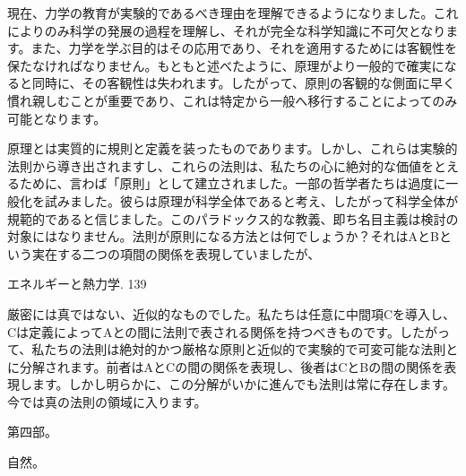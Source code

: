 \documentclass[a4paper,11pt,openany]{ltjsbook}
\begin{document}
現在、力学の教育が実験的であるべき理由を理解できるようになりました。これによりのみ科学の発展の過程を理解し、それが完全な科学知識に不可欠となります。また、力学を学ぶ目的はその応用であり、それを適用するためには客観性を保たなければなりません。もともと述べたように、原理がより一般的で確実になると同時に、その客観性は失われます。したがって、原則の客観的な側面に早く慣れ親しむことが重要であり、これは特定から一般へ移行することによってのみ可能となります。

原理とは実質的に規則と定義を装ったものであります。しかし、これらは実験的法則から導き出されますし、これらの法則は、私たちの心に絶対的な価値をとえるために、言わば「原則」として建立されました。一部の哲学者たちは過度に一般化を試みました。彼らは原理が科学全体であると考え、したがって科学全体が規範的であると信じました。このパラドックス的な教義、即ち名目主義は検討の対象にはなりません。法則が原則になる方法とは何でしょうか？それはAとBという実在する二つの項間の関係を表現していましたが、

エネルギーと熱力学. 139

厳密には真ではない、近似的なものでした。私たちは任意に中間項Cを導入し、Cは定義によってAとの間に法則で表される関係を持つべきものです。したがって、私たちの法則は絶対的かつ厳格な原則と近似的で実験的で可変可能な法則とに分解されます。前者はAとCの間の関係を表現し、後者はCとBの間の関係を表現します。しかし明らかに、この分解がいかに進んでも法則は常に存在します。今では真の法則の領域に入ります。

第四部。

自然。
\end{document}
